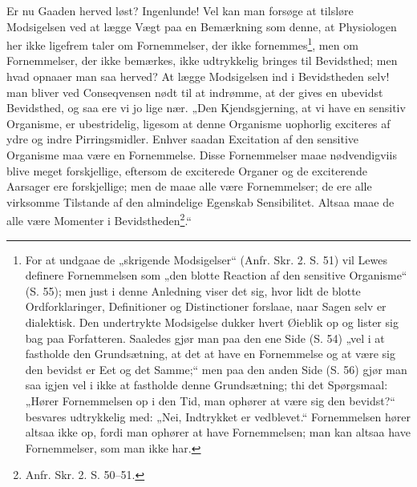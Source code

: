 \documentclass[11pt]{book}
\newcommand{\opage}[1]{\marginnote{\footnotesize\textit{[#1]}}}
\begin{document}
Er nu Gaaden herved løst? Ingenlunde! Vel kan man forsøge at tilsløre
Modsigelsen ved at lægge Vægt paa en Bemærkning som denne, at Physiologen her
ikke ligefrem taler om Fornemmelser, der ikke fornemmes\footnote{%
For at undgaae de „skrigende Modsigelser“ (Anfr. Skr. 2. S. 51) vil Lewes
definere Fornemmelsen som „den blotte Reaction af den sensitive Organisme“
(S. 55); men just i denne Anledning viser det
sig, hvor lidt de blotte Ordforklaringer, Definitioner og Distinctioner
forslaae, naar Sagen selv er dialektisk. Den undertrykte Modsigelse dukker
hvert Øieblik op og lister sig bag paa Forfatteren. Saaledes gjør man paa den
ene Side (S. 54) „vel i at fastholde den Grundsætning, at det at have en
Fornemmelse og at være sig den bevidst er Eet og det Samme;“ men paa den
anden Side (S. 56) gjør man saa igjen vel i ikke at fastholde denne
Grundsætning; thi det Spørgsmaal: „Hører Fornemmelsen op i den Tid, man
ophører at være sig den bevidst?“ besvares udtrykkelig med: „Nei, Indtrykket
er vedblevet.“ Fornemmelsen hører altsaa ikke op, fordi man ophører at have
Fornemmelsen; man kan altsaa have Fornemmelser, som man ikke har.}, men om
\opage{338} \setcounter{footnote}{0}%
Fornemmelser, der ikke bemærkes, ikke udtrykkelig bringes til Bevidsthed; men
hvad opnaaer man saa herved? At lægge Modsigelsen ind i Bevidstheden selv!
man bliver ved Conseqvensen nødt til at indrømme, at der gives en ubevidst
Bevidsthed, og saa ere vi jo lige nær. „Den Kjendsgjerning, at vi have en
sensitiv Organisme, er ubestridelig, ligesom at denne Organisme uophorlig
exciteres af ydre og indre Pirringsmidler.
Enhver saadan Excitation af den sensitive Organisme maa være en Fornemmelse.
Disse Fornemmelser maae nødvendigviis blive meget forskjellige, eftersom de
exciterede Organer og de exciterende Aarsager ere forskjellige; men de maae
alle være Fornemmelser; de ere alle virksomme Tilstande af den almindelige
Egenskab Sensibilitet. Altsaa maae de alle være Momenter i
Bevidstheden\footnote{%
Anfr. Skr. 2. S. 50--51.}.“
\end{document}
